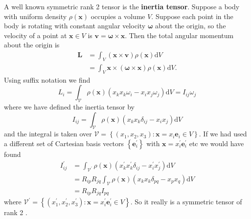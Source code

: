 \begin{example}
    A well known symmetric rank 2 tensor is the \textbf{inertia tensor}. Suppose a body with uniform density $\rho(\mathbf{x})$ occupies a volume $V$. Suppose each point in the body is rotating with constant angular velocity $\boldsymbol{\omega}$ about the origin, so the velocity of a point at $\mathbf{x} \in V$ is $\mathbf{v}=\boldsymbol{\omega} \times \mathbf{x}$. Then the total angular momentum about the origin is
    \[
    \begin{aligned}
    \mathbf{L} &=\int_{V}(\mathbf{x} \times \mathbf{v}) \rho(\mathbf{x}) \mathrm{d} V \\
    &=\int_{V} \mathbf{x} \times(\boldsymbol{\omega} \times \mathbf{x}) \rho(\mathbf{x}) \mathrm{d} V.
    \end{aligned}
    \]
    Using suffix notation we find
    \[
    L_{i}=\int_{\mathcal{V}} \rho(\mathbf{x})\left(x_{k} x_{k} \omega_{i}-x_{i} x_{j} \omega_{j}\right) \mathrm{d} V=I_{i j} \omega_{j}
    \]
    where we have defined the inertia tensor by
    \[
    I_{i j}=\int_{\mathcal{V}} \rho(\mathbf{x})\left(x_{k} x_{k} \delta_{i j}-x_{i} x_{j}\right) \mathrm{d} V
    \]
    and the integral is taken over $\mathcal{V}=\left\{\left(x_{1}, x_{2}, x_{3}\right): \mathbf{x}=x_{i} \mathbf{e}_{i} \in V\right\} .$ If we had used a different set of Cartesian basis vectors $\left\{\mathbf{e}_{i}^{\prime}\right\}$ with $\mathbf{x}=x_{i}^{\prime} \mathbf{e}_{i}^{\prime}$ etc we would have found
    \begin{align*}
        I_{i j}^{\prime}&=\int_{\mathcal{V}^{\prime}} \rho(\mathbf{x})\left(x_{k}^{\prime} x_{k}^{\prime} \delta_{i j}-x_{i}^{\prime} x_{j}^{\prime}\right) \mathrm{d} V\\ &=R_{i p} R_{j q} \int_{\mathcal{V}} \rho(\mathbf{x})\left(x_{k} x_{k} \delta_{p q}-x_{p} x_{q}\right) \mathrm{d} V\\ &=R_{i p} R_{j q} I_{p q}
    \end{align*}
    where $\mathcal{V}^{\prime}=\left\{\left(x_{1}^{\prime}, x_{2}^{\prime}, x_{3}^{\prime}\right): \mathbf{x}=x_{i}^{\prime} \mathbf{e}_{i}^{\prime} \in V\right\} .$ So it really is a symmetric tensor of rank 2 .
\end{example}

